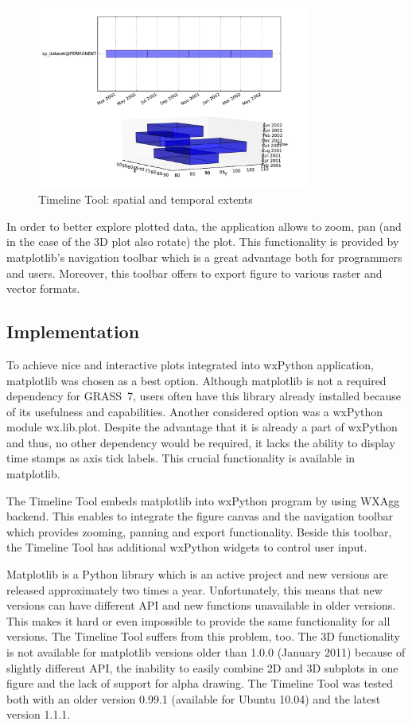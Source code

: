 \documentclass[a4paper,12pt,oneside]{book}
\begin{document}
\begin{figure}[ht!]
  \centering
  \includegraphics[width=0.8\textwidth]{./images/timeline2.pdf}
  \caption{Timeline Tool: spatial and temporal extents}
  \label{fig:timeline2}
\end{figure}

In order to better explore plotted data, the application allows to zoom,
pan (and in the case of the 3D plot also rotate) the plot.
This functionality is provided by matplotlib's navigation toolbar which is a great advantage both for programmers and users.
Moreover, this toolbar offers to export figure to various raster and vector formats.

\subsection{Implementation}
To achieve nice and interactive plots integrated into wxPython application, matplotlib was chosen as a best option.
Although matplotlib is not a required dependency for GRASS~7,
users often have this library already installed because of its usefulness and capabilities.
Another considered option was a wxPython module wx.lib.plot.
Despite the advantage that it is already a part of wxPython and thus, no other dependency would be required,
it lacks the ability to display time stamps as axis tick labels. This crucial functionality is available in matplotlib.

The Timeline Tool embeds matplotlib into wxPython program by using WXAgg backend.
This enables to integrate the figure canvas and the navigation toolbar
which provides zooming, panning and export functionality.
Beside this toolbar, the Timeline Tool has additional wxPython widgets to control user input.

Matplotlib is a Python library which is an active project and new versions are released approximately two times a year.
Unfortunately, this means that new versions can have different API and new functions unavailable in older versions.
This makes it hard or even impossible to provide the same functionality for all versions.
The Timeline Tool suffers from this problem, too.
The 3D functionality is not available for matplotlib versions older than 1.0.0 (January 2011)
because of slightly different API, the inability to easily combine 2D and 3D subplots in one figure
and the lack of support for alpha drawing.
The Timeline Tool was tested both with an older version 0.99.1 (available for Ubuntu 10.04) and the latest version 1.1.1.
\end{document}

